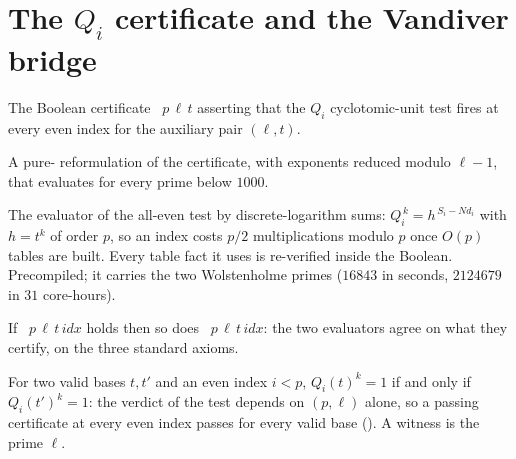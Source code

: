 \section{The $Q_i$ certificate and the Vandiver bridge}\label{sec:certificate}

\begin{definition}\label{def:vcert}
  \leanok
  The Boolean certificate ~$p\,\ell\,t$ asserting that the
  $Q_i$ cyclotomic-unit test fires at every even index for the auxiliary pair
  $(\ell, t)$.
\end{definition}

\begin{definition}\label{def:vcertfast}
  \leanok
  A pure- reformulation  of the certificate, with
  exponents reduced modulo $\ell - 1$, that  evaluates for every
  prime below $1000$.
\end{definition}

\begin{definition}\label{def:fast2cert}
  \leanok
  The evaluator  of the all-even test by discrete-logarithm sums:
  $Q_i^{\,k} = h^{\,S_i - N d_i}$ with $h = t^k$ of order $p$, so an index costs
  $p/2$ multiplications modulo $p$ once $O(p)$ tables are built. Every table fact it
  uses is re-verified inside the Boolean. Precompiled; it carries the two
  Wolstenholme primes ($16843$ in seconds, $2124679$ in $31$ core-hours).
\end{definition}

\begin{theorem}\label{thm:fast2bridge}
  \leanok
  If ~$p\,\ell\,t\,\mathit{idx}$ holds then so does
  ~$p\,\ell\,t\,\mathit{idx}$: the two evaluators agree on what they
  certify, on the three standard axioms.
\end{theorem}

\begin{theorem}\label{thm:baseindep}
  \leanok
  For two valid bases $t, t'$ and an even index $i < p$, $Q_i(t)^k = 1$ if and only if
  $Q_i(t')^k = 1$: the verdict of the test depends on $(p, \ell)$ alone, so a passing
  certificate at every even index passes for every valid base
  (). A witness is the prime $\ell$.
\end{theorem}


